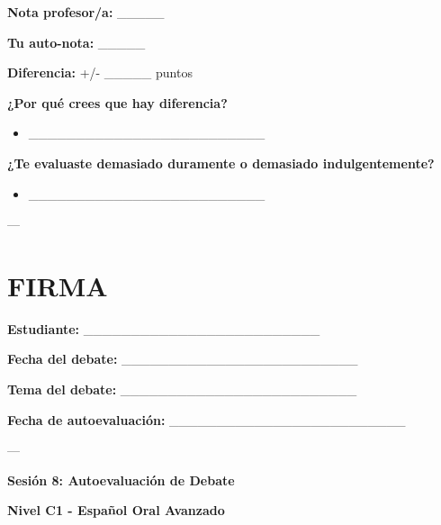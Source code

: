 \documentclass[a4paper,11pt]{article}
\begin{document}
\textbf{Nota profesor/a:} _____

\textbf{Tu auto-nota:} _____

\textbf{Diferencia:} +/- _____ puntos

\vspace{0.2cm}

\textbf{¿Por qué crees que hay diferencia?}

\begin{itemize}

  \item _________________________

\end{itemize}

\vspace{0.2cm}

\textbf{¿Te evaluaste demasiado duramente o demasiado indulgentemente?}

\begin{itemize}

  \item _________________________

\end{itemize}

\vspace{0.2cm}

---

\vspace{0.2cm}

\section{FIRMA}

\vspace{0.2cm}

\textbf{Estudiante:} _________________________

\textbf{Fecha del debate:} _________________________

\textbf{Tema del debate:} _________________________

\textbf{Fecha de autoevaluación:} _________________________

\vspace{0.2cm}

---

\vspace{0.2cm}

\textbf{Sesión 8: Autoevaluación de Debate}

\textbf{Nivel C1 - Español Oral Avanzado}

\vspace{0.2cm}
\end{document}
